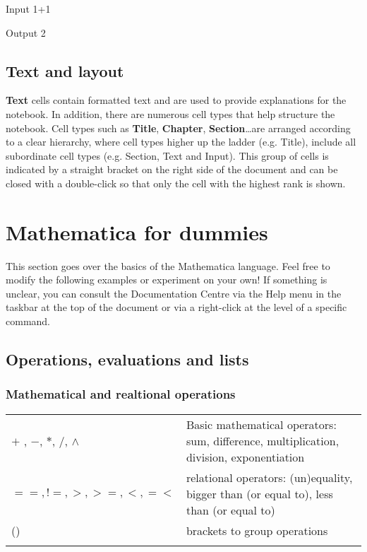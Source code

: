 \begin{mdframed}[backgroundcolor=gray!40,roundcorner=8pt]
	\begin{mmaCell}[]{Input}
		1+1
	\end{mmaCell}
	\begin{mmaCell}[]{Output}
		2
	\end{mmaCell}
\end{mdframed}

\subsection{Text and layout}
\textbf{Text} cells contain formatted text and are used to provide explanations for the notebook. In addition, there are numerous cell types that help structure the notebook. Cell types such as \textbf{Title}, \textbf{Chapter}, \textbf{Section}\ldots are arranged according to a clear hierarchy, where cell types higher up the ladder (e.g. Title), include all subordinate cell types (e.g. Section, Text and Input). This group of cells is indicated by a straight bracket on the right side of the document and can be closed with a double-click so that only the cell with the highest rank is shown. 

\section{Mathematica for dummies}
\label{sec:MathematicaTutorial}
This section goes over the basics of the Mathematica language. Feel free to modify the following examples or experiment on your own! If something is unclear, you can consult the Documentation Centre via the Help menu in the taskbar at the top of the document or via a right-click at the level of a specific command.

\subsection{Operations, evaluations and lists}
\subsubsection{Mathematical and realtional operations}

\begin{tabular}{>{\hfill}p{5cm}p{12cm}}
	$+$ , $-$, $*$, $/$, $\wedge$	&	Basic mathematical operators: sum, difference, multiplication, division, exponentiation\\
	$==,!=,>,>=,<,=<$	& relational operators: (un)equality, bigger than (or equal to), less than (or equal to)\\
	()				&	brackets to group operations\\
	\multicolumn{2}{l}{} 
\end{tabular}

